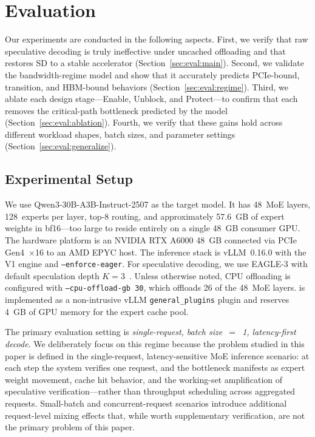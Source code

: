 \section{Evaluation}
\label{sec:eval}

Our experiments are conducted in the following aspects. First, we verify that raw speculative decoding is truly ineffective under uncached offloading and that \sysname restores SD to a stable accelerator (Section~\ref{sec:eval:main}). Second, we validate the bandwidth-regime model and show that it accurately predicts PCIe-bound, transition, and HBM-bound behaviors (Section~\ref{sec:eval:regime}). Third, we ablate each design stage---Enable, Unblock, and Protect---to confirm that each removes the critical-path bottleneck predicted by the model (Section~\ref{sec:eval:ablation}). Fourth, we verify that these gains hold across different workload shapes, batch sizes, and parameter settings (Section~\ref{sec:eval:generalize}).

\subsection{Experimental Setup}

We use Qwen3-30B-A3B-Instruct-2507 as the target model. It has 48~MoE layers, 128~experts per layer, top-8 routing, and approximately 57.6~GB of expert weights in bf16---too large to reside entirely on a single 48~GB consumer GPU. The hardware platform is an NVIDIA RTX A6000 48~GB connected via PCIe Gen4~$\times$16 to an AMD EPYC host. The inference stack is vLLM~0.16.0 with the V1 engine and \texttt{--enforce-eager}. For speculative decoding, we use EAGLE-3 with default speculation depth $K=3$~\cite{li2025eagle3}. Unless otherwise noted, CPU offloading is configured with \texttt{--cpu-offload-gb~30}, which offloads 26 of the 48~MoE layers. \sysname is implemented as a non-intrusive vLLM \texttt{general\_plugins} plugin and reserves 4~GB of GPU memory for the expert cache pool.

The primary evaluation setting is \emph{single-request, batch size~$=$~1, latency-first decode}. We deliberately focus on this regime because the problem studied in this paper is defined in the single-request, latency-sensitive MoE inference scenario: at each step the system verifies one request, and the bottleneck manifests as expert weight movement, cache hit behavior, and the working-set amplification of speculative verification---rather than throughput scheduling across aggregated requests. Small-batch and concurrent-request scenarios introduce additional request-level mixing effects that, while worth supplementary verification, are not the primary problem of this paper.


